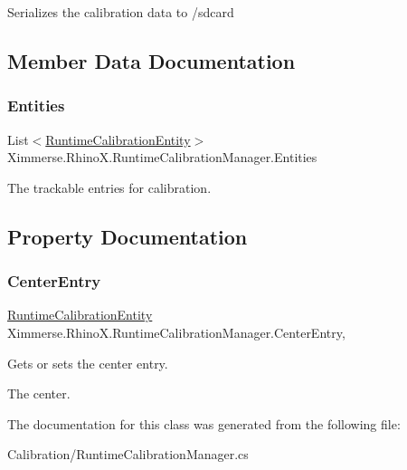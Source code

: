 Serializes the calibration data to /sdcard 



\subsection{Member Data Documentation}
\mbox{\label{class_ximmerse_1_1_rhino_x_1_1_runtime_calibration_manager_abf1b09b36bf1e6bccca57a451a263376}} 
\subsubsection{\texorpdfstring{Entities}{Entities}}
{\footnotesize\ttfamily List$<$\mbox{\hyperlink{class_ximmerse_1_1_rhino_x_1_1_runtime_calibration_entity}{Runtime\+Calibration\+Entity}}$>$ Ximmerse.\+Rhino\+X.\+Runtime\+Calibration\+Manager.\+Entities}



The trackable entries for calibration. 



\subsection{Property Documentation}
\mbox{\label{class_ximmerse_1_1_rhino_x_1_1_runtime_calibration_manager_a1202f2b01cb1c6e6ee7f332ee0ad9e97}} 
\subsubsection{\texorpdfstring{Center\+Entry}{CenterEntry}}
{\footnotesize\ttfamily \mbox{\hyperlink{class_ximmerse_1_1_rhino_x_1_1_runtime_calibration_entity}{Runtime\+Calibration\+Entity}} Ximmerse.\+Rhino\+X.\+Runtime\+Calibration\+Manager.\+Center\+Entry\hspace{0.3cm}{\ttfamily [get]}, {\ttfamily [set]}}



Gets or sets the center entry. 

The center.

The documentation for this class was generated from the following file\+:\begin{DoxyCompactItemize}
\item 
Calibration/Runtime\+Calibration\+Manager.\+cs\end{DoxyCompactItemize}

